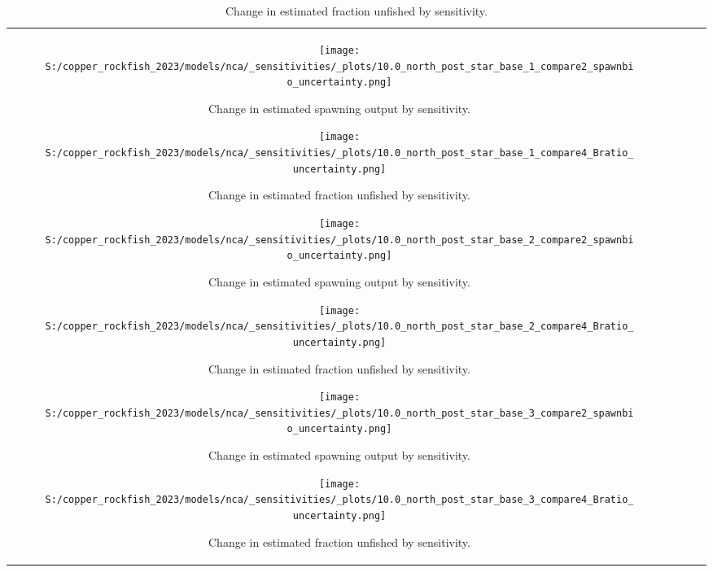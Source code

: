 \documentclass[11pt,
  letterpaper,
]{article}
\begin{document}
\begin{longtable}[t]{c>{\centering\arraybackslash}p{2cm}>{\centering\arraybackslash}p{2cm}>{\centering\arraybackslash}p{2cm}}
\newpage

\begin{figure}
{\centering
\texttt{[image: S:/copper\_rockfish\_2023/models/nca/\_sensitivities/\_plots/10.0\_north\_post\_star\_base\_1\_compare2\_spawnbio\_uncertainty.png]}
}
\caption{Change in estimated spawning output by sensitivity.\label{fig:sens-ssb-1}}
\end{figure}

\newpage

\begin{figure}
{\centering
\texttt{[image: S:/copper\_rockfish\_2023/models/nca/\_sensitivities/\_plots/10.0\_north\_post\_star\_base\_1\_compare4\_Bratio\_uncertainty.png]}
}
\caption{Change in estimated fraction unfished by sensitivity.\label{fig:sens-depl-1}}
\end{figure}

\newpage

\begin{figure}
{\centering
\texttt{[image: S:/copper\_rockfish\_2023/models/nca/\_sensitivities/\_plots/10.0\_north\_post\_star\_base\_2\_compare2\_spawnbio\_uncertainty.png]}
}
\caption{Change in estimated spawning output by sensitivity.\label{fig:sens-ssb-2}}
\end{figure}

\newpage

\begin{figure}
{\centering
\texttt{[image: S:/copper\_rockfish\_2023/models/nca/\_sensitivities/\_plots/10.0\_north\_post\_star\_base\_2\_compare4\_Bratio\_uncertainty.png]}
}
\caption{Change in estimated fraction unfished by sensitivity.\label{fig:sens-depl-2}}
\end{figure}

\newpage

\begin{figure}
{\centering
\texttt{[image: S:/copper\_rockfish\_2023/models/nca/\_sensitivities/\_plots/10.0\_north\_post\_star\_base\_3\_compare2\_spawnbio\_uncertainty.png]}
}
\caption{Change in estimated spawning output by sensitivity.\label{fig:sens-ssb-3}}
\end{figure}

\newpage

\begin{figure}
{\centering
\texttt{[image: S:/copper\_rockfish\_2023/models/nca/\_sensitivities/\_plots/10.0\_north\_post\_star\_base\_3\_compare4\_Bratio\_uncertainty.png]}
}
\caption{Change in estimated fraction unfished by sensitivity.\label{fig:sens-depl-3}}
\end{figure}


\end{longtable}
\end{document}
